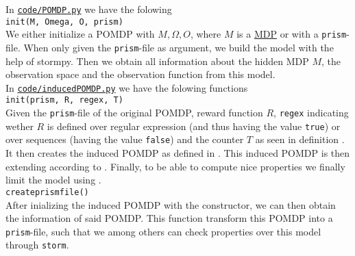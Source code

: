 \label{s:induced_implementation}
In \href{https://gitlab.science.ru.nl/srietbergen/thesis/-/blob/master/code/POMDP.py}{\texttt{code/POMDP.py}} we have the folowing\\

\texttt{\textunderscore\textunderscore init\textunderscore\textunderscore (M, Omega, O, prism)}\\
We either initialize a POMDP with $M, \Omega, O$, where $M$ is a \href{https://gitlab.science.ru.nl/srietbergen/thesis/-/blob/master/code/MDP.py}{MDP} or with a \texttt{prism}-file. When only given the \texttt{prism}-file as argument, we build the model with the help of stormpy\cite{g:stormpy}. Then we obtain all information about the hidden MDP $M$, the observation space and the observation function from this model. \\

In \href{https://gitlab.science.ru.nl/srietbergen/thesis/-/blob/master/code/induced_POMDP.py}{\texttt{code/induced\textunderscore POMDP.py}} we have the folowing functions \\

\texttt{\textunderscore\textunderscore init\textunderscore\textunderscore (prism, R, regex, T)}\\
Given the \texttt{prism}-file of the original POMDP, reward function $R$, \texttt{regex} indicating wether $R$ is defined over regular expression (and thus having the value \texttt{true}) or over sequences (having the value \texttt{false}) and the counter $T$ as seen in definition . It then creates the induced POMDP as defined in . This induced POMDP is then extending according to . Finally, to be able to compute nice properties we finally limit the model using .\\

\texttt{create\textunderscore prism\textunderscore file()}\\
After inializing the induced POMDP with the constructor, we can then obtain the information of said POMDP. This function transform this POMDP into a \texttt{prism}-file, such that we among others can check properties over this model through \texttt{storm}\cite{g:storm}.